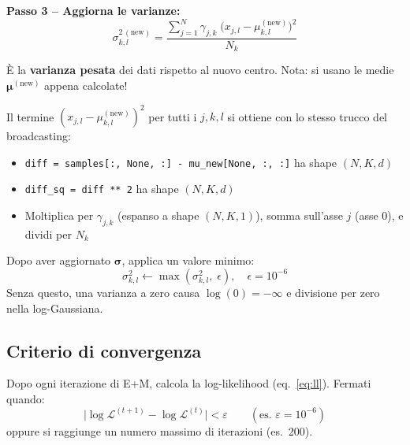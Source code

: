 \documentclass[11pt,a4paper]{article}
\begin{document}
\bigskip
\textbf{Passo 3 -- Aggiorna le varianze:}
\begin{equation}
    \boxed{\sigma_{k,l}^{2\,(\text{new})} = \frac{\displaystyle\sum_{j=1}^{N} \gamma_{j,k}\;\bigl(x_{j,l} - \mu_{k,l}^{(\text{new})}\bigr)^2}{N_k}}
    \label{eq:sigma_update}
\end{equation}

\`E la \textbf{varianza pesata} dei dati rispetto al nuovo centro. Nota: si usano le medie $\boldsymbol{\mu}^{(\text{new})}$ appena calcolate!

\begin{tipbox}
Il termine $(x_{j,l} - \mu_{k,l}^{(\text{new})})^2$ per tutti i $j, k, l$ si ottiene con lo stesso trucco del broadcasting:
\begin{itemize}
    \item \texttt{diff = samples[:, None, :] - mu\_new[None, :, :]} ha shape $(N, K, d)$
    \item \texttt{diff\_sq = diff ** 2} ha shape $(N, K, d)$
    \item Moltiplica per $\gamma_{j,k}$ (espanso a shape $(N, K, 1)$), somma sull'asse $j$ (asse 0), e dividi per $N_k$
\end{itemize}
\end{tipbox}

\begin{warnbox}
Dopo aver aggiornato $\boldsymbol{\sigma}$, applica un valore minimo:
$$\sigma_{k,l}^2 \leftarrow \max\!\left(\sigma_{k,l}^2, \;\epsilon\right), \quad \epsilon = 10^{-6}$$
Senza questo, una varianza a zero causa $\log(0) = -\infty$ e divisione per zero nella log-Gaussiana.
\end{warnbox}

\subsection{Criterio di convergenza}

Dopo ogni iterazione di E+M, calcola la log-likelihood (eq.~\eqref{eq:ll}). Fermati quando:
\begin{equation}
    \bigl|\log\mathcal{L}^{(t+1)} - \log\mathcal{L}^{(t)}\bigr| < \varepsilon \qquad (\text{es.\ } \varepsilon = 10^{-6})
\end{equation}
oppure si raggiunge un numero massimo di iterazioni (es.\ 200).
\end{document}
